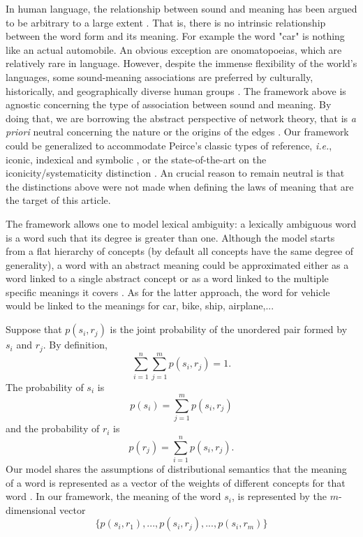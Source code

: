\documentclass{article}
\begin{document}
In human language, the relationship between sound and meaning has been argued to be arbitrary to a large extent \cite{Saussure1916a, Hockett1966a, Pinker1999a}. That is, there is no intrinsic relationship between the word form and its meaning.  For example the word "car" is nothing like an actual automobile. An obvious exception are onomatopoeias, which are relatively rare in language. However, despite the immense flexibility of the world's languages, some sound-meaning associations are preferred by culturally, historically, and geographically diverse human groups \cite{Blasi2016a}. The framework above is agnostic concerning the type of association between sound and meaning. By doing that, we are borrowing the abstract perspective of network theory, that is {\em a priori} neutral concerning the nature or the origins of the edges \cite{Newman2010a,Barthelemy2011a}. Our framework could be generalized to accommodate Peirce's classic types of reference, {\em i.e.}, iconic, indexical and symbolic \cite{Deacon1997}, or the state-of-the-art on the iconicity/systematicity distinction \cite{Dingemanse2015a}. An crucial reason to remain neutral is that the distinctions above were not made when defining the laws of meaning that are the target of this article.

The framework allows one to model lexical ambiguity: a lexically ambiguous word is a word such that its degree is greater than one. Although the model starts from a flat hierarchy of concepts (by default all concepts have the same degree of generality), a word with an abstract meaning could be approximated either as a word linked to a single abstract concept or as a word linked to the multiple specific meanings it covers \cite{Ferrer2013g}. As for the latter approach, the word for vehicle would be linked to the meanings for car, bike, ship, airplane,...

Suppose that $p(s_i, r_j)$ is the joint probability of the unordered pair formed by $s_i$ and $r_j$. 
By definition, 
\begin{equation}
\sum_{i=1}^n \sum_{j=1}^m p(s_i, r_j) = 1.
\label{normalization_of_joint_probability_equation}
\end{equation}
The probability of $s_i$ is   
\begin{equation}
p(s_i) = \sum_{j=1}^m p(s_i, r_j)
\label{word_probability_equation}
\end{equation}
and the probability of $r_i$ is   
\begin{equation}
p(r_j) = \sum_{i=1}^n p(s_i, r_j).
\label{meaning_probability_equation}
\end{equation}
Our model shares the assumptions of distributional semantics that the meaning of a word is represented as a vector of the weights of different concepts for that word \cite{Lund1996a}. In our framework, the meaning of the word $s_i$, is represented by the $m$-dimensional vector
\begin{equation*}
\{p(s_i, r_1),...,p(s_i, r_j),...,p(s_i, r_m)\}
\end{equation*}
\end{document}
